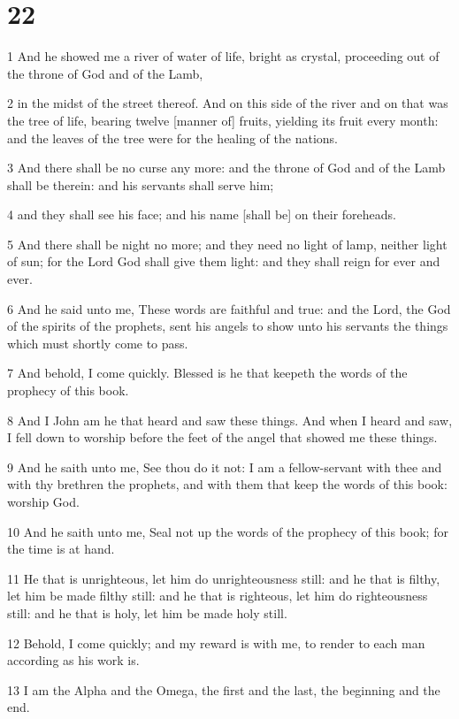 \chapter{22}

\par 1 And he showed me a river of water of life, bright as crystal, proceeding out of the throne of God and of the Lamb,
\par 2 in the midst of the street thereof. And on this side of the river and on that was the tree of life, bearing twelve [manner of] fruits, yielding its fruit every month: and the leaves of the tree were for the healing of the nations.
\par 3 And there shall be no curse any more: and the throne of God and of the Lamb shall be therein: and his servants shall serve him;
\par 4 and they shall see his face; and his name [shall be] on their foreheads.
\par 5 And there shall be night no more; and they need no light of lamp, neither light of sun; for the Lord God shall give them light: and they shall reign for ever and ever.
\par 6 And he said unto me, These words are faithful and true: and the Lord, the God of the spirits of the prophets, sent his angels to show unto his servants the things which must shortly come to pass.
\par 7 And behold, I come quickly. Blessed is he that keepeth the words of the prophecy of this book.
\par 8 And I John am he that heard and saw these things. And when I heard and saw, I fell down to worship before the feet of the angel that showed me these things.
\par 9 And he saith unto me, See thou do it not: I am a fellow-servant with thee and with thy brethren the prophets, and with them that keep the words of this book: worship God.
\par 10 And he saith unto me, Seal not up the words of the prophecy of this book; for the time is at hand.
\par 11 He that is unrighteous, let him do unrighteousness still: and he that is filthy, let him be made filthy still: and he that is righteous, let him do righteousness still: and he that is holy, let him be made holy still.
\par 12 Behold, I come quickly; and my reward is with me, to render to each man according as his work is.
\par 13 I am the Alpha and the Omega, the first and the last, the beginning and the end.
